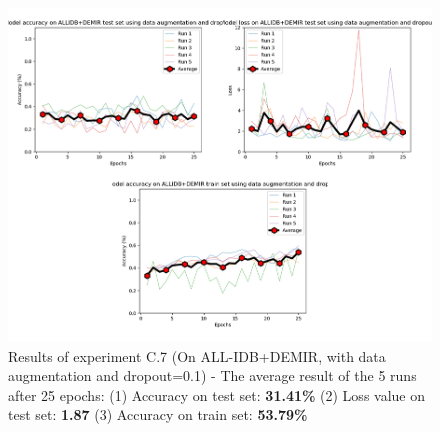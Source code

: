 \documentclass[11pt, openany]{report}
\theoremstyle{plain}
\theoremstyle{definition}
\theoremstyle{remark}
\begin{document}
\begin{figure}[H]
  \centering
  \includegraphics[scale=0.45]{Code/ch6-LeukemiaSubtypes/figures_result/LEUK-SUBTYPES/leukSub-data_aug_dropout.PNG}
  \caption{Results of experiment C.7 (On ALL-IDB+DEMIR, with data augmentation and dropout=0.1) - The average result of the 5 runs after 25 epochs: (1) Accuracy on test set: \textbf{31.41\%} (2) Loss value on test set: \textbf{1.87} (3) Accuracy on train set: \textbf{53.79\%}}
  \label{fig:results-C7}
\end{figure}
\end{document}
